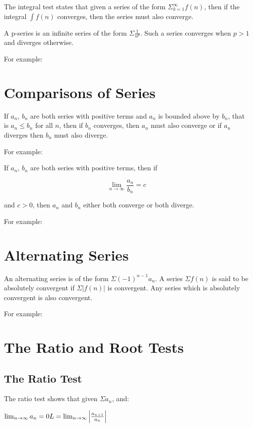 \documentclass{article}
\begin{document}
The integral test states that given a series of the form
$\Sigma^\infty_{k=1}f(n)$, then if the integral $\int f(n)$ converges,
then the series must also converge.

A p-series is an infinite series of the form $\Sigma \frac{1}{n^p}$.
Such a series converges when $p > 1$ and diverges otherwise.

For example:

\section{Comparisons of Series}

If $a_n$, $b_n$ are both series with positive terms and $a_n$ is
bounded above by $b_n$, that is $a_n \leq b_n$ for all $n$, then if
$b_n$ converges, then $a_n$ must also converge or if $a_n$ diverges
then $b_n$ must also diverge.

For example:

If $a_n$, $b_n$ are both series with positive terms, then if

\[
\lim_{n \to \infty} \frac{a_n}{b_n} = c
\]

and $c > 0$, then $a_n$ and $b_n$ either both converge or both diverge.

For example:

\section{Alternating Series}

An alternating series is of the form $\Sigma (-1)^{n-1}a_n$.  A series
$\Sigma f(n)$ is said to be absolutely convergent if $\Sigma \left|
  f(n) \right|$ is convergent.  Any series which is absolutely
convergent is also convergent.

For example:

\section{The Ratio and Root Tests}

\subsection{The Ratio Test}

The ratio test shows that given $\Sigma a_n$, and:

\begin{math}
  \lim_{n \to \infty} a_n = 0 \\
  L = \lim_{n \to \infty} \left| \frac{a_{n+1}}{a_n} \right|
\end{math}
\end{document}

